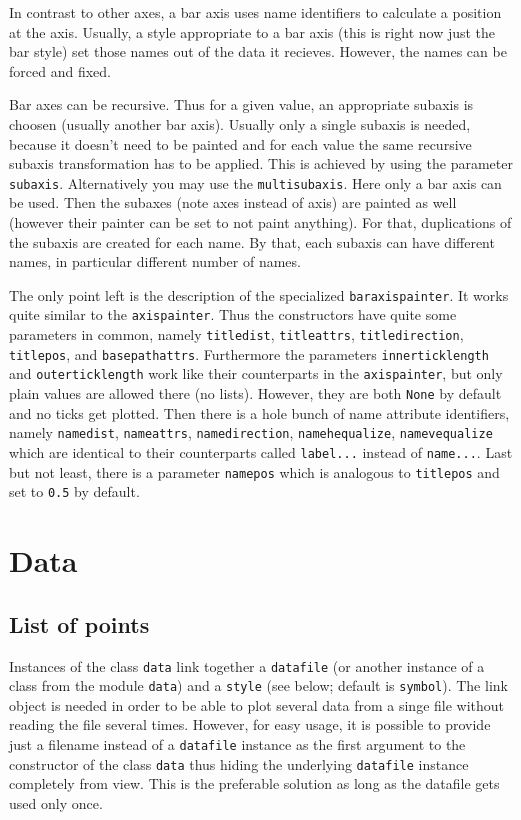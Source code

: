 In contrast to other axes, a bar axis uses name identifiers to
calculate a position at the axis. Usually, a style appropriate to a
bar axis (this is right now just the bar style) set those names out of
the data it recieves. However, the names can be forced and fixed.

Bar axes can be recursive. Thus for a given value, an appropriate
subaxis is choosen (usually another bar axis). Usually only a single
subaxis is needed, because it doesn't need to be painted and for each
value the same recursive subaxis transformation has to be applied.
This is achieved by using the parameter \verb|subaxis|. Alternatively
you may use the \verb|multisubaxis|. Here only a bar axis can be used.
Then the subaxes (note axes instead of axis) are painted as well
(however their painter can be set to not paint anything). For that,
duplications of the subaxis are created for each name. By that, each
subaxis can have different names, in particular different number of
names.

The only point left is the description of the specialized
\verb|baraxispainter|. It works quite similar to the
\verb|axispainter|. Thus the constructors have quite some parameters
in common, namely \verb|titledist|, \verb|titleattrs|,
\verb|titledirection|, \verb|titlepos|, and \verb|basepathattrs|.
Furthermore the parameters \verb|innerticklength| and
\verb|outerticklength| work like their counterparts in the
\verb|axispainter|, but only plain values are allowed there (no
lists). However, they are both \verb|None| by default and no ticks
get plotted. Then there is a hole bunch of name
attribute identifiers, namely \verb|namedist|, \verb|nameattrs|,
\verb|namedirection|, \verb|namehequalize|, \verb|namevequalize| which
are identical to their counterparts called \verb|label...| instead of
\verb|name...|. Last but not least, there is a parameter \verb|namepos|
which is analogous to \verb|titlepos| and set to \verb|0.5| by
default.

\section{Data}
\label{graph:data}

\subsection{List of points}

Instances of the class \verb|data| link together a \verb|datafile| (or
another instance of a class from the module \verb|data|) and a
\verb|style| (see below; default is \verb|symbol|). The link object is
needed in order to be able to plot several data from a singe file
without reading the file several times. However, for easy usage, it is
possible to provide just a filename instead of a \verb|datafile|
instance as the first argument to the constructor of the class
\verb|data| thus hiding the underlying \verb|datafile| instance
completely from view. This is the preferable solution as long as the
datafile gets used only once.

